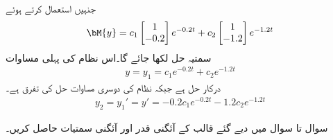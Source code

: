 جنہیں استعمال کرتے ہوئے
\begin{align*}
\bM{y}=c_1\begin{bmatrix*} 1 \\ -0.2  \end{bmatrix*}e^{-0.2 t}+c_2 \begin{bmatrix*}  1 \\ -1.2 \end{bmatrix*} e^{-1.2 t}
\end{align*}
سمتیہ حل لکھا جائے گا۔اس نظام کی پہلی مساوات
\begin{align*}
y=y_1=c_1e^{-0.2 t}+c_2e^{-1.2 t}
\end{align*}
درکار حل ہے جبکہ نظام کی دوسری مساوات حل کی تفرق ہے۔
\begin{align*}
y_2=y_1'=y'=-0.2c_1e^{-0.2 t}-1.2c_2e^{-1.2t}
\end{align*}

سوال  تا سوال  میں دیے گئے قالب کے آئگنی قدر اور آئگنی سمتیات حاصل کریں۔

